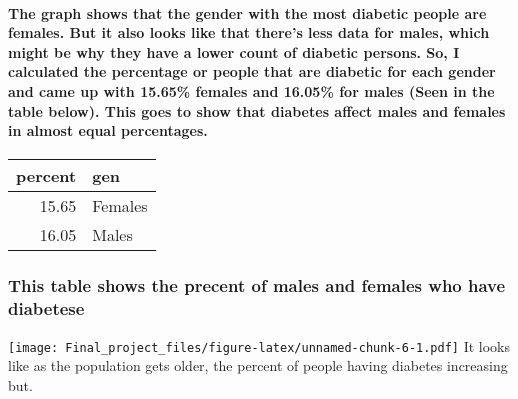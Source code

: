 \documentclass[
]{article}
\begin{document}
\hypertarget{the-graph-shows-that-the-gender-with-the-most-diabetic-people-are-females.-but-it-also-looks-like-that-theres-less-data-for-males-which-might-be-why-they-have-a-lower-count-of-diabetic-persons.-so-i-calculated-the-percentage-or-people-that-are-diabetic-for-each-gender-and-came-up-with-15.65-females-and-16.05-for-males-seen-in-the-table-below.-this-goes-to-show-that-diabetes-affect-males-and-females-in-almost-equal-percentages.}{%
\paragraph{The graph shows that the gender with the most diabetic people
are females. But it also looks like that there's less data for males,
which might be why they have a lower count of diabetic persons. So, I
calculated the percentage or people that are diabetic for each gender
and came up with 15.65\% females and 16.05\% for males (Seen in the
table below). This goes to show that diabetes affect males and females
in almost equal
percentages.}\label{the-graph-shows-that-the-gender-with-the-most-diabetic-people-are-females.-but-it-also-looks-like-that-theres-less-data-for-males-which-might-be-why-they-have-a-lower-count-of-diabetic-persons.-so-i-calculated-the-percentage-or-people-that-are-diabetic-for-each-gender-and-came-up-with-15.65-females-and-16.05-for-males-seen-in-the-table-below.-this-goes-to-show-that-diabetes-affect-males-and-females-in-almost-equal-percentages.}}

\begin{table}
\centering
\begin{tabular}[t]{r|l}
\hline
percent & gen\\
\hline
15.65 & Females\\
\hline
16.05 & Males\\
\hline
\end{tabular}
\end{table}

\hypertarget{this-table-shows-the-precent-of-males-and-females-who-have-diabetese}{%
\subsubsection{This table shows the precent of males and females who
have
diabetese}\label{this-table-shows-the-precent-of-males-and-females-who-have-diabetese}}

\texttt{[image: Final\_project\_files/figure-latex/unnamed-chunk-6-1.pdf]}
It looks like as the population gets older, the percent of people having
diabetes increasing but.
\end{document}
